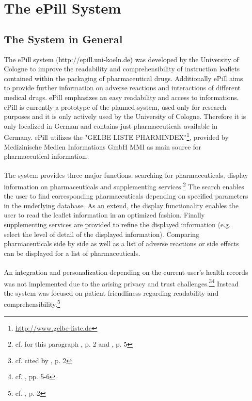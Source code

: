 \section{The ePill System}
\subsection{The System in General}
The ePill system (http://epill.uni-koeln.de) was developed by the University of Cologne to improve the readability and comprehensibility of instruction leaflets contained within the packaging of pharmaceutical drugs. Additionally ePill aims to provide further information on adverse reactions and interactions of different medical drugs. ePill emphasizes an easy readability and access to informations.
\\
ePill is currently a prototype of the planned system, used only for research purposes and it is only actively used by the University of Cologne. Therefore it is only localized in German and contains just pharmaceuticals available in Germany. ePill utilizes the "GELBE LISTE PHARMINDEX"\footnote{\url{http://www.gelbe-liste.de}}, provided by Medizinische Medien Informations GmbH MMI as main source for pharmaceutical information.
\\
\\
The system provides three major functions: searching for pharmaceuticals, display information on pharmaceuticals and supplementing services.\footnote{cf. for this paragraph \cite{Dehling.2012}, p. 2 and \cite{Dehling.2012b}, p. 5} The search enables the user to find corresponding pharmaceuticals depending on specified parameters in the underlying database. As an extend, the display functionality enables the user to read the leaflet information in an optimized fashion. Finally supplementing services are provided to refine the displayed information (e.g. select the level of detail of the displayed information). Comparing pharmaceuticals side by side as well as a list of adverse reactions or side effects can be displayed for a list of pharmaceuticals.
\\
\\
An integration and personalization depending on the current user's health records was not implemented due to the arising privacy and trust challenges.\footnote{cf. \cite{Kaletsch.2011} cited by \cite{Dehling.2012}, p. 2}\footnote{cf. \cite{Kaletsch.2011}, pp. 5-6} Instead the system was focused on patient friendliness regarding readability and comprehensibility.\footnote{cf. \cite{Dehling.2012b}, p. 2}
\\
